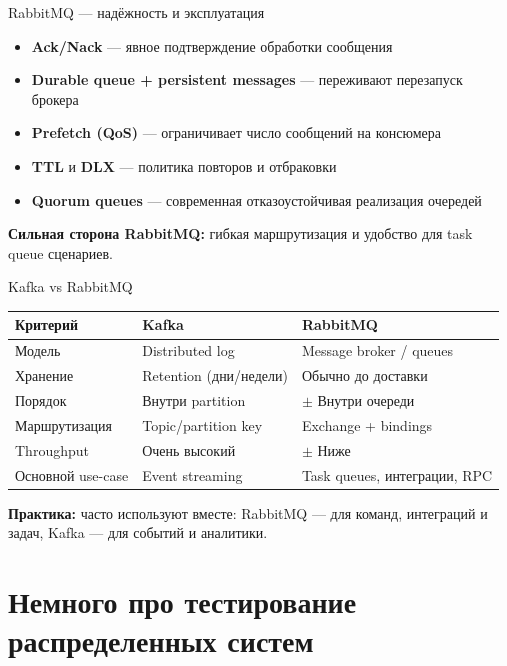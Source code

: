 \documentclass{beamer}
\begin{document}
\begin{frame}{RabbitMQ --- надёжность и эксплуатация}
\begin{itemize}
  \item \textbf{Ack/Nack} --- явное подтверждение обработки сообщения
  \item \textbf{Durable queue + persistent messages} --- переживают перезапуск брокера
  \item \textbf{Prefetch (QoS)} --- ограничивает число сообщений на консюмера
  \item \textbf{TTL} и \textbf{DLX} --- политика повторов и отбраковки
  \item \textbf{Quorum queues} --- современная отказоустойчивая реализация очередей
\end{itemize}
\vspace{0.3cm}
\textbf{Сильная сторона RabbitMQ:} гибкая маршрутизация и удобство для task queue сценариев.
\end{frame}

\begin{frame}{Kafka vs RabbitMQ}
\begin{center}
\begin{tabular}{lll}
\textbf{Критерий}       & \textbf{Kafka}                        & \textbf{RabbitMQ}                  \\ \hline
Модель                 & Distributed log                        & Message broker / queues            \\
Хранение               & Retention (дни/недели)                & Обычно до доставки                 \\
Порядок                & Внутри partition                       & $\pm$ Внутри очереди       \\
Маршрутизация          & Topic/partition key                    & Exchange + bindings      \\
Throughput             & Очень высокий                         & $\pm$ Ниже      \\
Основной use-case      & Event streaming                       & Task queues, интеграции, RPC       \\
\end{tabular}
\end{center}
\vspace{0.2cm}
\textbf{Практика:} часто используют вместе: RabbitMQ --- для команд, интеграций и задач, Kafka --- для событий и аналитики.
\end{frame}

\section{Немного про тестирование распределенных систем}
\end{document}
